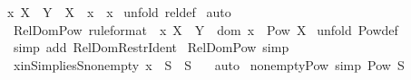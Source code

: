 \begin{isabellebody}
{\isachardoublequoteopen}x{\isacharcolon}\ {\isacharparenleft}X\ {\isacharless}{\isacharminus}{\isacharminus}{\isachargreater}\ Y{\isacharparenright}\ {\isacharminus}{\isacharminus}{\isachargreater}\ {\isacharparenleft}X\ {\isacharless}{\isacharcolon}\ x\ {\isacharequal}\ x{\isacharparenright}{\isachardoublequoteclose}\isanewline
%
\isadelimproof
%
\endisadelimproof
%
\isatagproof
{}\isamarkupfalse%
\ {\isacharparenleft}unfold\ rel{\isacharunderscore}def{\isacharparenright}\isanewline
{}\isamarkupfalse%
\ auto\isanewline
{}\isamarkupfalse%
%
\endisatagproof
{\isafoldproof}%
%
\isadelimproof
\isanewline
%
\endisadelimproof
\isanewline
{}\isamarkupfalse%
\ Rel{\isacharunderscore}Dom{\isacharunderscore}Pow\ {\isacharbrackleft}rule{\isacharunderscore}format{\isacharbrackright}{\isacharcolon}\ \ {\isachardoublequoteopen}x{\isacharcolon}\ {\isacharparenleft}X\ {\isacharless}{\isacharminus}{\isacharminus}{\isachargreater}\ Y{\isacharparenright}\ {\isacharminus}{\isacharminus}{\isachargreater}\ dom\ x\ {\isacharcolon}\ {\isacharparenleft}Pow\ X{\isacharparenright}{\isachardoublequoteclose}\isanewline
%
\isadelimproof
%
\endisadelimproof
%
\isatagproof
{}\isamarkupfalse%
\ {\isacharparenleft}unfold\ Pow{\isacharunderscore}def{\isacharparenright}\isanewline
{}\isamarkupfalse%
\ {\isacharparenleft}simp\ add{\isacharcolon}\ Rel{\isacharunderscore}Dom{\isacharunderscore}Restr{\isacharunderscore}Ident{\isacharparenright}\isanewline
{}\isamarkupfalse%
%
\endisatagproof
{\isafoldproof}%
%
\isadelimproof
\isanewline
%
\endisadelimproof
{}\isamarkupfalse%
\ Rel{\isacharunderscore}Dom{\isacharunderscore}Pow\ {\isacharbrackleft}simp{\isacharbrackright}\isanewline
\isanewline
{}\isamarkupfalse%
\ x{\isacharunderscore}in{\isacharunderscore}S{\isacharunderscore}implies{\isacharunderscore}S{\isacharunderscore}nonempty{\isacharcolon}\ {\isachardoublequoteopen}x\ {\isacharcolon}\ S\ {\isacharequal}{\isacharequal}{\isachargreater}\ S\ {\isachartilde}{\isacharequal}\ {\isacharbraceleft}{\isacharbraceright}{\isachardoublequoteclose}\isanewline
%
\isadelimproof
\isanewline
%
\endisadelimproof
%
\isatagproof
{}\isamarkupfalse%
\ auto\isanewline
{}\isamarkupfalse%
%
\endisatagproof
{\isafoldproof}%
%
\isadelimproof
\isanewline
%
\endisadelimproof
\isanewline
{}\isamarkupfalse%
\ nonempty{\isacharunderscore}Pow\ {\isacharbrackleft}simp{\isacharbrackright}{\isacharcolon}\ {\isachardoublequoteopen}Pow\ S\ {\isachartilde}{\isacharequal}\ {\isacharbraceleft}{\isacharbraceright}{\isachardoublequoteclose}\isanewline

\end{isabellebody}
